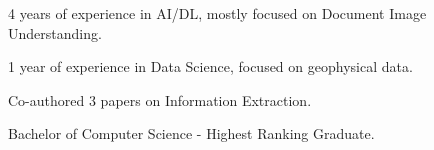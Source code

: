 \begin{zitemize}
    \item 4 years of experience in AI/DL, mostly focused on Document Image Understanding.
    \item 1 year of experience in Data Science, focused on geophysical data.
    \item Co-authored 3 papers on Information Extraction.
    \item Bachelor of Computer Science - Highest Ranking Graduate.
\end{zitemize}
